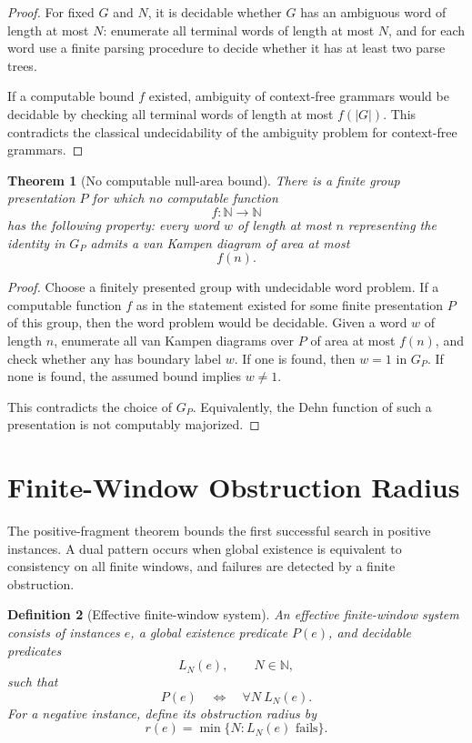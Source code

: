 \documentclass[11pt]{article}
\newtheorem{theorem}{Theorem}[section]
\newtheorem{definition}[theorem]{Definition}
\begin{document}
\begin{proof}
For fixed \(G\) and \(N\), it is decidable whether \(G\) has an ambiguous word of length at most \(N\): enumerate all terminal words of length at most \(N\), and for each word use a finite parsing procedure to decide whether it has at least two parse trees.

If a computable bound \(f\) existed, ambiguity of context-free grammars would be decidable by checking all terminal words of length at most \(f(|G|)\). This contradicts the classical undecidability of the ambiguity problem for context-free grammars.
\end{proof}

\begin{theorem}[No computable null-area bound]
There is a finite group presentation \(P\) for which no computable function
\[
f:\mathbb N\to\mathbb N
\]
has the following property: every word \(w\) of length at most \(n\) representing the identity in \(G_P\) admits a van Kampen diagram of area at most
\[
f(n).
\]
\end{theorem}

\begin{proof}
Choose a finitely presented group with undecidable word problem. If a computable function \(f\) as in the statement existed for some finite presentation \(P\) of this group, then the word problem would be decidable. Given a word \(w\) of length \(n\), enumerate all van Kampen diagrams over \(P\) of area at most \(f(n)\), and check whether any has boundary label \(w\). If one is found, then \(w=1\) in \(G_P\). If none is found, the assumed bound implies \(w\neq1\).

This contradicts the choice of \(G_P\). Equivalently, the Dehn function of such a presentation is not computably majorized.
\end{proof}

\section{Finite-Window Obstruction Radius}

The positive-fragment theorem bounds the first successful search in positive instances. A dual pattern occurs when global existence is equivalent to consistency on all finite windows, and failures are detected by a finite obstruction.

\begin{definition}[Effective finite-window system]
An effective finite-window system consists of instances \(e\), a global existence predicate \(P(e)\), and decidable predicates
\[
L_N(e),\qquad N\in\mathbb N,
\]
such that
\[
P(e)\quad\Longleftrightarrow\quad \forall N\ L_N(e).
\]
For a negative instance, define its obstruction radius by
\[
r(e)=\min\{N:L_N(e)\text{ fails}\}.
\]
\end{definition}
\end{document}
